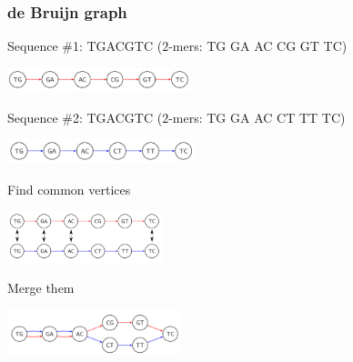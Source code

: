 \begin{frame}
	\frametitle{de Bruijn graph}
	\centering
	  
  Sequence \#1: {\color{red} TGACGTC} ($2$-mers: {\color{red} TG GA AC CG GT TC})
  
  \medskip

	\includegraphics[height=0.7cm]{images/debruin-0}

  \medskip
  
  Sequence \#2: {\color{blue}TGACGTC} ($2$-mers: {\color{blue} TG GA AC CT TT TC})
	
	\medskip
	
	\includegraphics[height=0.7cm]{images/debruin-1}
	
	\medskip
	
	Find common vertices

	\medskip
  \includegraphics[height=1.5cm]{images/debruin-2}

  \medskip
  
  Merge them
	\medskip

	\includegraphics[height=1.3cm]{images/debruin-3}


\end{frame}


